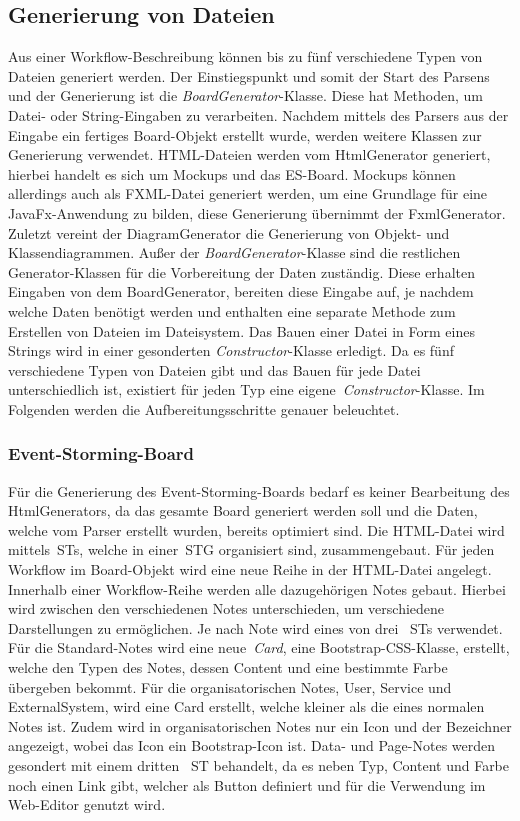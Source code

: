 \subsection{Generierung von Dateien}\label{subsec:generierung-von-dateien}
Aus einer Workflow-Beschreibung können bis zu fünf verschiedene Typen von Dateien generiert werden.
Der Einstiegspunkt und somit der Start des Parsens und der Generierung ist die \textit{BoardGenerator}-Klasse.
Diese hat Methoden, um Datei- oder String-Eingaben zu verarbeiten.
Nachdem mittels des Parsers aus der Eingabe ein fertiges Board-Objekt erstellt wurde, werden weitere Klassen zur Generierung verwendet.
HTML-Dateien werden vom HtmlGenerator generiert, hierbei handelt es sich um Mockups und das \ac{ES}-Board.
Mockups können allerdings auch als FXML-Datei generiert werden, um eine Grundlage für eine JavaFx-Anwendung zu bilden, diese Generierung
übernimmt der FxmlGenerator.
Zuletzt vereint der DiagramGenerator die Generierung von Objekt- und Klassendiagrammen.
Außer der \textit{BoardGenerator}-Klasse sind die restlichen Generator-Klassen für die Vorbereitung der Daten zuständig.
Diese erhalten Eingaben von dem BoardGenerator, bereiten diese Eingabe auf, je nachdem welche Daten benötigt werden und enthalten eine
separate Methode zum Erstellen von Dateien im Dateisystem.
Das Bauen einer Datei in Form eines Strings wird in einer gesonderten \textit{Constructor}-Klasse erledigt.
Da es fünf verschiedene Typen von Dateien gibt und das Bauen für jede Datei unterschiedlich ist, existiert für jeden Typ eine eigene~\textit{Constructor}-Klasse.
Im Folgenden werden die Aufbereitungsschritte genauer beleuchtet.

\subsubsection{Event-Storming-Board}
Für die Generierung des Event-Storming-Boards bedarf es keiner Bearbeitung des HtmlGenerators, da das gesamte Board generiert werden soll und die Daten,
welche vom Parser erstellt wurden, bereits optimiert sind.
Die HTML-Datei wird mittels~\acp{ST}, welche in einer~\ac{STG} organisiert sind, zusammengebaut.
Für jeden Workflow im Board-Objekt wird eine neue Reihe in der HTML-Datei angelegt.
Innerhalb einer Workflow-Reihe werden alle dazugehörigen Notes gebaut.
Hierbei wird zwischen den verschiedenen Notes unterschieden, um verschiedene Darstellungen zu ermöglichen.
Je nach Note wird eines von drei ~\acp{ST} verwendet.
Für die Standard-Notes wird eine neue~\textit{Card}, eine Bootstrap-CSS-Klasse, erstellt, welche den Typen des Notes, dessen Content und eine bestimmte Farbe übergeben bekommt.
Für die organisatorischen Notes, User, Service und ExternalSystem, wird eine Card erstellt, welche kleiner als die eines normalen Notes ist.
Zudem wird in organisatorischen Notes nur ein Icon und der Bezeichner angezeigt, wobei das Icon ein Bootstrap-Icon ist.
Data- und Page-Notes werden gesondert mit einem dritten ~\ac{ST} behandelt, da es neben Typ, Content und Farbe noch einen Link gibt, welcher als Button definiert und für die Verwendung
im Web-Editor genutzt wird.

